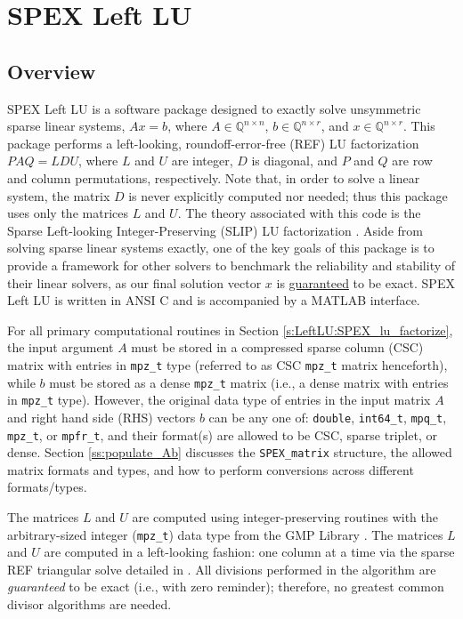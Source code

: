 \documentclass[12pt]{report}
\theoremstyle{definition}
\begin{document}
\chapter{SPEX Left LU} \label{ch:LeftLU}

\section{Overview} \label{s:LeftLU:intro}

SPEX Left LU is a software package designed to exactly solve unsymmetric sparse
linear systems, $ A x = b$, where $A \in \mathbb{Q}^{n \times
n}$, $b \in \mathbb{Q}^{n \times r}$, and $x \in \mathbb{Q}^{n \times
r}$. This package performs a left-looking, roundoff-error-free (REF) LU
factorization $P A Q = L D U$, where $L$ and $U$ are integer, $D$ is diagonal,
and $P$ and $Q$ are row and column permutations, respectively. 
Note that, in order to solve a linear system, the matrix $D$ is never explicitly computed nor needed; thus this 
package uses only the matrices $L$ and $U$. The theory associated with this code is the Sparse Left-looking Integer-Preserving (SLIP) LU factorization
 \cite{lourenco2019exact}. Aside from
solving sparse linear systems exactly, one of the key goals of this package is
to provide a framework for other solvers to benchmark the reliability and
stability of their linear solvers, as our final solution vector $x$ is
\ul{guaranteed} to be exact. SPEX Left LU is written in ANSI C and is accompanied by a MATLAB interface.

For all primary computational routines in Section \ref{s:LeftLU:SPEX_lu_factorize}, the input
argument $A$ must be stored in a compressed sparse column (CSC) matrix with
entries in \verb|mpz_t| type (referred to as CSC \verb|mpz_t| matrix henceforth), while $b$ must be stored as a dense \verb|mpz_t| matrix (i.e., a
dense matrix with entries in \verb|mpz_t| type).  However, the original data type of entries in the input matrix $A$ and right hand side (RHS) vectors $b$ can be any one of: \verb|double|, \verb|int64_t|, \verb|mpq_t|,
\verb|mpz_t|, or \verb|mpfr_t|, and their format(s) are allowed to be 
CSC, sparse triplet, or dense. Section \ref{ss:populate_Ab} discusses the \verb|SPEX_matrix| structure, the allowed matrix formats and types, and how to perform conversions across different formats/types.

The matrices $L$ and $U$ are computed using integer-preserving
routines with the arbitrary-sized integer (\verb|mpz_t|) data type from the GMP Library
\cite{granlund2015gnu}. The matrices $L$ and $U$ are computed in a left-looking fashion: one column at a
time via the sparse REF triangular solve
detailed in \cite{lourenco2019exact}. All divisions performed in the algorithm
are \textit{guaranteed} to be exact (i.e., with zero reminder); therefore, no greatest common
divisor algorithms are needed.
\end{document}
